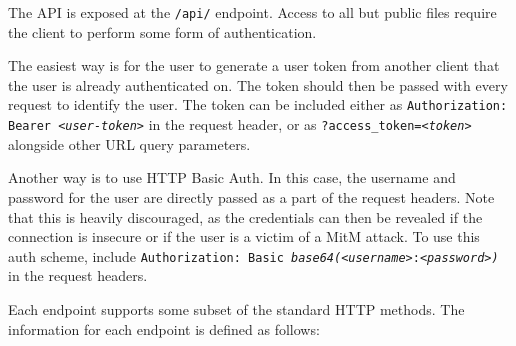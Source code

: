 \documentclass[12pt,a4paper]{report}
\begin{document}
The API is exposed at the \texttt{/api/} endpoint.
Access to all but public files require the client to perform some form of authentication.

The easiest way is for the user to generate a user token from another client that the user is already authenticated on.
The token should then be passed with every request to identify the user.
The token can be included either as \texttt{Authorization: Bearer \textsl{<user-token>}} in the request header, or as \texttt{?access\_token=\textsl{<token>}} alongside other URL query parameters.

Another way is to use HTTP Basic Auth.
In this case, the username and password for the user are directly passed as a part of the request headers.
Note that this is heavily discouraged, as the credentials can then be revealed if the connection is insecure or if the user is a victim of a MitM attack.
To use this auth scheme, include \texttt{Authorization: Basic \textit{base64(}\textsl{<username>}:\textsl{<password>}\textit{)}} in the request headers.

Each endpoint supports some subset of the standard HTTP methods.
The information for each endpoint is defined as follows:
\end{document}
